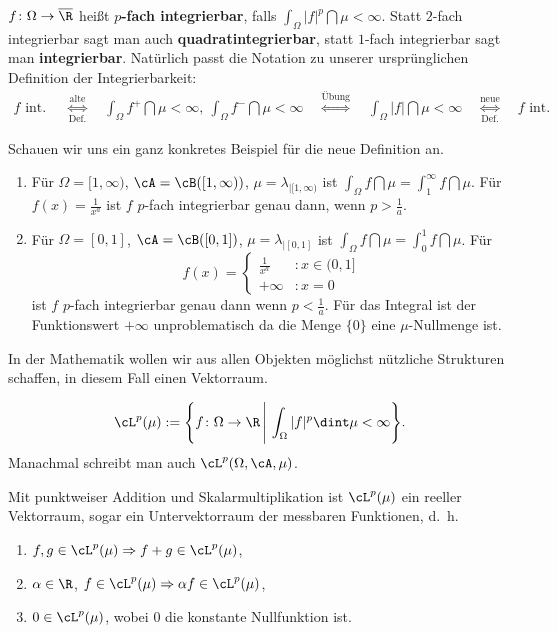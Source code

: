 \begin{deff}\label{neueDef}
	$f \colon \Omega \to \overline{\R}$ heißt \textbf{$p$-fach integrierbar}, falls $ \int_{\Omega} |f|^p \dint \mu < \infty$. Statt $2$-fach integrierbar sagt man auch \textbf{quadratintegrierbar}, statt $1$-fach integrierbar sagt man \textbf{integrierbar}. Nat\"urlich passt die Notation zu unserer urspr\"unglichen Definition der Integrierbarkeit:
	\begin{gather*}
	f \text{ int. } \quad\overset{\text{alte}}{\underset{\text{Def.}}{\Leftrightarrow}} \quad\int_{\Omega} f^+ \dint \mu < \infty, \: \int_{\Omega} f^- \dint \mu < \infty \quad\overset{\text{Übung}}{\Leftrightarrow} \quad\int_{\Omega} |f| \dint \mu < \infty \quad \overset{\text{neue}}{\underset{\text{Def.}}{\Leftrightarrow}} \quad f \text{ int. }
	\end{gather*}
\end{deff}
Schauen wir uns ein ganz konkretes Beispiel f\"ur die neue Definition an. 
\begin{beispiel}\abs
	\begin{enumerate}[label=(\roman*)]
		\item Für $\Omega = [1, \infty)$, $\cA = \cB([1,\infty))$, $ \mu = \lambda_{|[1, \infty)}$ ist $ \int_{\Omega} f \dint \mu = \int_{1}^{\infty} f \dint \mu$. Für $f(x) = \frac{1}{x^a}$ ist $f$ $p$-fach integrierbar genau dann, wenn $p > \frac{1}{a}$.
		\item Für $\Omega = [0, 1]$, $\cA = \cB([0, 1])$, $ \mu = \lambda_{|[0, 1]}$ ist $ \int_{\Omega} f \dint \mu = \int_{0}^{1} f \dint \mu$. Für 
		\[ f(x) = \begin{cases}
		\frac{1}{x^a}&:x \in (0,1]\\
		+ \infty&:x = 0
		\end{cases} \]
		ist $f$ $p$-fach integrierbar genau dann wenn $p < \frac{1}{a}$. F\"ur das Integral ist der Funktionswert $+\infty$ unproblematisch da die Menge $\{0\}$ eine $\mu$-Nullmenge ist.
	\end{enumerate}
\end{beispiel}
In der Mathematik wollen wir aus allen Objekten m\"oglichst n\"utzliche Strukturen schaffen, in diesem Fall einen Vektorraum.
\begin{deff}
	\[ \cL^p(\mu) := \Bigg\{ f \colon \Omega \to \R\, \Bigg|\, \int_{\Omega} |f|^p \dint \mu < \infty \Bigg\}. \]
	Manachmal schreibt man auch $\cL^p(\Omega, \cA, \mu)$.
\end{deff}

\begin{lemma}
	Mit punktweiser Addition und Skalarmultiplikation ist $\cL^p(\mu)$ ein reeller Vektorraum, sogar ein Untervektorraum der messbaren Funktionen, \mbox{d. h.} 
	\begin{enumerate}[label=(\roman*)]
		\item\label{uvr1} $f,g \in \cL^p(\mu) \Rightarrow f+g \in \cL^p(\mu)$,
		\item $\alpha \in \R$, $f \in \cL^p(\mu) \Rightarrow \alpha f \in \cL^p(\mu)$,
		\item\label{uvr2} $0 \in \cL^p(\mu)$, wobei $0$ die konstante Nullfunktion ist.
	\end{enumerate}
\end{lemma}

